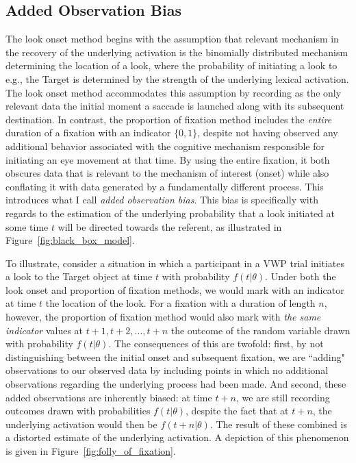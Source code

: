 \subsection{Added Observation Bias}

The look onset method begins with the assumption that relevant mechanism in the recovery of the underlying activation is the binomially distributed mechanism determining the location of a look, where the probability of initiating a look to e.g., the Target is determined by the strength of the underlying lexical activation. The look onset method accommodates this assumption by recording as the only relevant data the initial moment a saccade is launched along with its subsequent destination. In contrast, the proportion of fixation method includes the \textit{entire} duration of a fixation with an indicator $\{0,1\}$, despite not having observed any additional behavior associated with the cognitive mechanism responsible for initiating an eye movement at that time. By using the entire fixation, it both obscures data that is relevant to the mechanism of interest (onset) while also conflating it with data generated by a fundamentally different process. This introduces what I call \textit{added observation bias}. This bias is specifically with regards to the estimation of the underlying probability that a look initiated at some time $t$ will be directed towards the referent, as illustrated in Figure~\ref{fig:black_box_model}.


To illustrate, consider a situation in which a participant in a VWP trial initiates a look to the Target object at time $t$ with probability $f(t|\theta)$. Under both the look onset and proportion of fixation methods, we would mark with an indicator at time $t$ the location of the look. For a fixation with a duration of length $n$, however, the proportion of fixation method would also mark with \textit{the same indicator} values at $t+1, t+2, \dots, t+n$ the outcome of the random variable drawn with probability $f(t|\theta)$. The consequences of this are twofold: first, by not distinguishing between the initial onset and subsequent fixation, we are ``adding" observations to our observed data by including points in which no additional observations regarding the underlying process had been made. And second, these added observations are inherently biased: at time $t+n$, we are still recording outcomes drawn with probabilities $f(t|\theta)$, despite the fact that at $t+n$, the underlying activation would then be $f(t+n | \theta)$. The result of these combined is a distorted  estimate of the underlying activation. A depiction of this phenomenon is given in Figure~\ref{fig:folly_of_fixation}.


